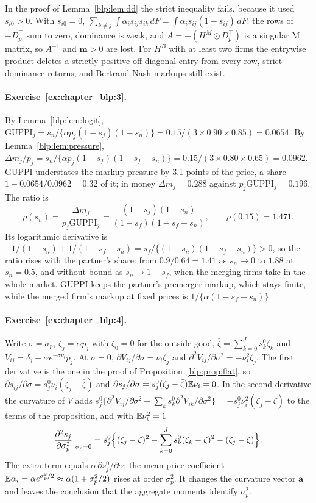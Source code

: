In the proof of Lemma~\ref{blp:lem:dd} the strict inequality fails, because it used $s_{i0}>0$. With $s_{i0}=0$, $\sum_{k\neq j}\int\alpha_is_{ij}s_{ik}\,dF=\int\alpha_is_{ij}(1-s_{ij})\,dF$: the rows of $-D_p^\top$ sum to zero, dominance is weak, and $A=-(H^M\odot D_p^\top)$ is a singular M matrix, so $A^{-1}$ and $\bm m>0$ are lost. For $H^B$ with at least two firms the entrywise product deletes a strictly positive off diagonal entry from every row, strict dominance returns, and Bertrand Nash markups still exist.

\paragraph{Exercise~\ref{ex:chapter_blp:3}.} By Lemma~\ref{blp:lem:logit}, $\mathrm{GUPPI}_j=s_n/\{\alpha p_j(1-s_j)(1-s_n)\}=0.15/(3\times0.90\times0.85)=0.0654$. By Lemma~\ref{blp:lem:pressure}, $\Delta m_j/p_j=s_n/\{\alpha p_j(1-s_f)(1-s_f-s_n)\}=0.15/(3\times0.80\times0.65)=0.0962$. GUPPI understates the markup pressure by 3.1 points of the price, a share $1-0.0654/0.0962=0.32$ of it; in money $\Delta m_j=0.288$ against $p_j\mathrm{GUPPI}_j=0.196$. The ratio is
\[
\rho(s_n)=\frac{\Delta m_j}{p_j\mathrm{GUPPI}_j}=\frac{(1-s_j)(1-s_n)}{(1-s_f)(1-s_f-s_n)},\qquad \rho(0.15)=1.471 .
\]
Its logarithmic derivative is $-1/(1-s_n)+1/(1-s_f-s_n)=s_f/\{(1-s_n)(1-s_f-s_n)\}>0$, so the ratio rises with the partner's share: from $0.9/0.64=1.41$ as $s_n\to0$ to $1.88$ at $s_n=0.5$, and without bound as $s_n\to1-s_f$, when the merging firms take in the whole market. GUPPI keeps the partner's premerger markup, which stays finite, while the merged firm's markup at fixed prices is $1/\{\alpha(1-s_f-s_n)\}$.

\paragraph{Exercise~\ref{ex:chapter_blp:4}.} Write $\sigma=\sigma_p$, $\zeta_j=\alpha p_j$ with $\zeta_0=0$ for the outside good, $\bar\zeta=\sum_{k=0}^Js^0_k\zeta_k$ and $V_{ij}=\delta_j-\alpha e^{-\sigma\nu_i}p_j$. At $\sigma=0$, $\partial V_{ij}/\partial\sigma=\nu_i\zeta_j$ and $\partial^2V_{ij}/\partial\sigma^2=-\nu_i^2\zeta_j$. The first derivative is the one in the proof of Proposition~\ref{blp:prop:flat}, so $\partial s_{ij}/\partial\sigma=s^0_j\nu_i(\zeta_j-\bar\zeta)$ and $\partial s_j/\partial\sigma=s^0_j(\zeta_j-\bar\zeta)\mathbb{E}\nu_i=0$. In the second derivative the curvature of $V$ adds $s^0_j\{\partial^2V_{ij}/\partial\sigma^2-\sum_ks^0_k\partial^2V_{ik}/\partial\sigma^2\}=-s^0_j\nu_i^2(\zeta_j-\bar\zeta)$ to the terms of the proposition, and with $\mathbb{E}\nu_i^2=1$
\[
\frac{\partial^2s_j}{\partial\sigma_p^2}\Big|_{\sigma_p=0}=s^0_j\Bigl\{(\zeta_j-\bar\zeta)^2-\sum_{k=0}^Js^0_k(\zeta_k-\bar\zeta)^2-(\zeta_j-\bar\zeta)\Bigr\}.
\]
The extra term equals $\alpha\,\partial s^0_j/\partial\alpha$: the mean price coefficient $\mathbb{E}\alpha_i=\alpha e^{\sigma_p^2/2}\approx\alpha(1+\sigma_p^2/2)$ rises at order $\sigma_p^2$. It changes the curvature vector $\bm a$ and leaves the conclusion that the aggregate moments identify $\sigma_p^2$.

